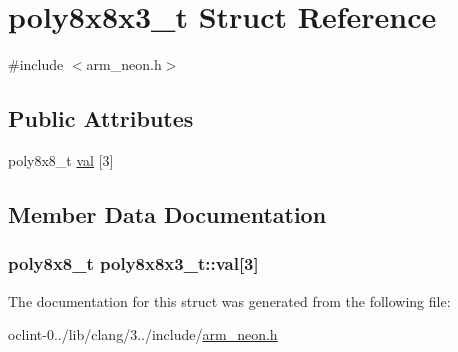 \hypertarget{structpoly8x8x3__t}{\section{poly8x8x3\-\_\-t Struct Reference}
\label{structpoly8x8x3__t}
}


{\ttfamily \#include $<$arm\-\_\-neon.\-h$>$}

\subsection*{Public Attributes}
\begin{DoxyCompactItemize}
\item 
poly8x8\-\_\-t \hyperlink{structpoly8x8x3__t_a508903926a827e8e3f85377d53a1a953}{val} \mbox{[}3\mbox{]}
\end{DoxyCompactItemize}


\subsection{Member Data Documentation}
\hypertarget{structpoly8x8x3__t_a508903926a827e8e3f85377d53a1a953}{
\subsubsection[{val}]{\setlength{\rightskip}{0pt plus 5cm}poly8x8\-\_\-t poly8x8x3\-\_\-t\-::val\mbox{[}3\mbox{]}}}\label{structpoly8x8x3__t_a508903926a827e8e3f85377d53a1a953}


The documentation for this struct was generated from the following file\-:\begin{DoxyCompactItemize}
\item 
oclint-\/0../lib/clang/3../include/\hyperlink{arm__neon_8h}{arm\-\_\-neon.\-h}\end{DoxyCompactItemize}
